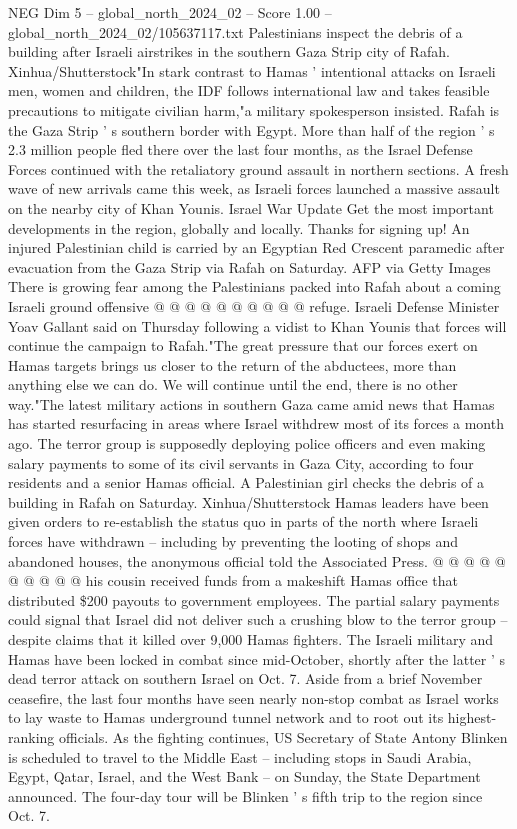 \begin{textsample}{NEG Dim 5 – global\_north\_2024\_02 – Score 1.00 – global\_north\_2024\_02/105637117.txt}  \label{ex:f5_neg_220}
Palestinians inspect the debris of a building after Israeli airstrikes in the southern Gaza Strip city of Rafah.
Xinhua/Shutterstock"In stark contrast to Hamas ' intentional attacks on Israeli men, women and children, the IDF follows international law and takes feasible precautions to mitigate civilian harm,"a military spokesperson insisted.
Rafah is the Gaza Strip ' s southern border with Egypt.
More than half of the region ' s 2.3 million people fled there over the last four months, as the Israel Defense Forces continued with the retaliatory ground assault in northern sections.
A fresh wave of new arrivals came this week, as Israeli forces launched a massive assault on the nearby city of Khan Younis.
Israel War Update Get the most important developments in the region, globally and locally.
Thanks for signing up!
An injured Palestinian child is carried by an Egyptian Red Crescent paramedic after evacuation from the Gaza Strip via Rafah on Saturday.
AFP via Getty Images There is growing fear among the Palestinians packed into Rafah about a coming Israeli ground offensive @ @ @ @ @ @ @ @ @ @ refuge.
Israeli Defense Minister Yoav Gallant said on Thursday following a vidist to Khan Younis that forces will continue the campaign to Rafah."The great pressure that our forces exert on Hamas targets brings us closer to the return of the abductees, more than anything else we can do.
We will continue until the end, there is no other way."The latest military actions in southern Gaza came amid news that Hamas has started resurfacing in areas where Israel withdrew most of its forces a month ago.
The terror group is supposedly deploying police officers and even making salary payments to some of its civil servants in Gaza City, according to four residents and a senior Hamas official.
A Palestinian girl checks the debris of a building in Rafah on Saturday.
Xinhua/Shutterstock Hamas leaders have been given orders to re-establish the status quo in parts of the north where Israeli forces have withdrawn -- including by preventing the looting of shops and abandoned houses, the anonymous official told the Associated Press. @ @ @ @ @ @ @ @ @ @ his cousin received funds from a makeshift Hamas office that distributed \$200 payouts to government employees.
The partial salary payments could signal that Israel did not deliver such a crushing blow to the terror group -- despite claims that it killed over 9,000 Hamas fighters.
The Israeli military and Hamas have been locked in combat since mid-October, shortly after the latter ' s dead terror attack on southern Israel on Oct. 7.
Aside from a brief November ceasefire, the last four months have seen nearly non-stop combat as Israel works to lay waste to Hamas underground tunnel network and to root out its highest-ranking officials.
As the fighting continues, US Secretary of State Antony Blinken is scheduled to travel to the Middle East -- including stops in Saudi Arabia, Egypt, Qatar, Israel, and the West Bank -- on Sunday, the State Department announced.
The four-day tour will be Blinken ' s fifth trip to the region since Oct. 7.

\end{textsample}
